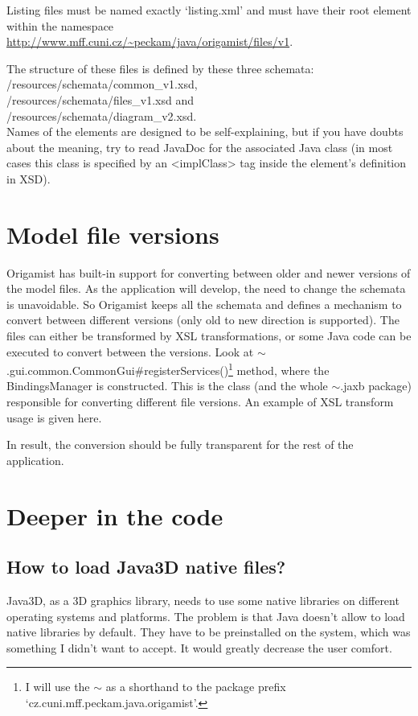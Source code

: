 Listing files must be named exactly `listing.xml' and must have their root element within the namespace \\ \url{http://www.mff.cuni.cz/~peckam/java/origamist/files/v1}.

The structure of these files is defined by these three schemata: \\
/resources/schemata/common\_v1.xsd, \\
/resources/schemata/files\_v1.xsd and \\
/resources/schemata/diagram\_v2.xsd. \\

Names of the elements are designed to be self-explaining, but if you have doubts about the meaning, try to read JavaDoc for the associated Java class (in most cases this class is specified by an <implClass> tag inside the element's definition in XSD).

\section{Model file versions}
Origamist has built-in support for converting between older and newer versions of the model files. As the application will develop, the need to change the schemata is unavoidable. So Origamist keeps all the schemata and defines a mechanism to convert between different versions (only old to new direction is supported). The files can either be transformed by XSL transformations, or some Java code can be executed to convert between the versions. Look at $\sim$.gui.common.CommonGui\#registerServices()\footnote{I will use the $\sim$ as a shorthand to the package prefix `cz.cuni.mff.peckam.java.origamist'.} method, where the BindingsManager is constructed. This is the class (and the whole $\sim$.jaxb package) responsible for converting different file versions. An example of XSL transform usage is given here.

In result, the conversion should be fully transparent for the rest of the application.

\section{Deeper in the code}

\subsection{How to load Java3D native files?}
\label{ssec:java3DnativeFiles}
Java3D, as a 3D graphics library, needs to use some native libraries on different operating systems and platforms. The problem is that Java doesn't allow to load native libraries by default. They have to be preinstalled on the system, which was something I didn't want to accept. It would greatly decrease the user comfort.


